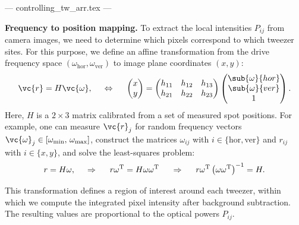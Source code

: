 


--- controlling_tw_arr.tex ---

\textbf{Frequency to position mapping.}
To extract the local intensities $P_{ij}$ from camera images, we need to determine which pixels correspond to which tweezer sites. For this purpose, we define an affine transformation from the drive frequency space $(\omega_{\mathrm{hor}}, \omega_{\mathrm{ver}})$ to image plane coordinates $(x, y)$:
\begin{equation*}
    \vc{r} = H \vc{\omega},
    \hspace{5 mm} \Leftrightarrow \hspace{5 mm} 
    \begin{pmatrix}
        x \\ y
    \end{pmatrix} = \begin{pmatrix}
        h_{11} & h_{12} & h_{13} \\
        h_{21} & h_{22} & h_{23}
    \end{pmatrix} 
    \begin{pmatrix}
        \sub{\omega}{hor} \\
        \sub{\omega}{ver} \\
        1
    \end{pmatrix}.
\end{equation*}
Here, $H$ is a $2 \times 3$ matrix calibrated from a set of measured spot positions. For example, one can measure $\vc{r}_j$ for random frequency vectors $\vc{\omega}_j \in [\omega_{\mathrm{min}},\, \omega_{\mathrm{max}}]$, construct the matrices $\omega_{ij}$ with $i \in \{\mathrm{hor}, \mathrm{ver}\}$ and $r_{ij}$ with $i \in \{x, y\}$, and solve the least-squares problem:
\begin{equation}
    r = H \omega,
    \hspace{0.5cm} \Rightarrow \hspace{0.5cm}
    r \omega^\mathrm{T} = H \omega \omega^\mathrm{T}
    \hspace{0.5cm} \Rightarrow \hspace{0.5cm}
    r \omega^\mathrm{T} \left(\omega \omega^\mathrm{T}\right)^{-1} = H.
    \label{eq:linreg-freq2pos}
\end{equation}

This transformation defines a region of interest around each tweezer, within which we compute the integrated pixel intensity after background subtraction. The resulting values are proportional to the optical powers $P_{ij}$.

